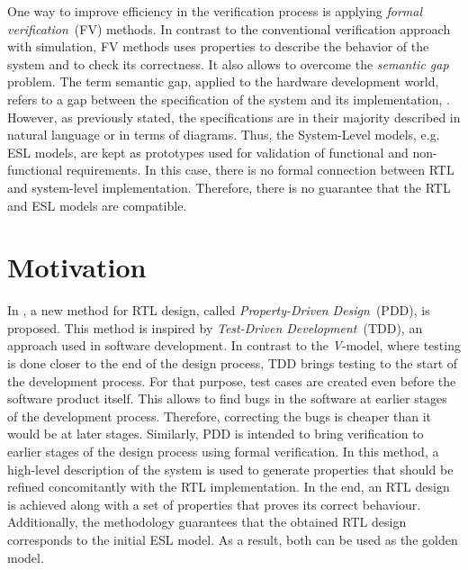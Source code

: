 One way to improve efficiency in the verification process is applying \textit{formal verification}~(FV) methods. In contrast to the conventional verification approach with simulation, FV methods uses properties to describe the behavior of the system and to check its correctness. It also allows to overcome the \textit{semantic gap} problem. The term semantic gap, applied to the hardware development world, refers to a gap between the specification of the system and its implementation,   . However, as previously stated, the specifications are in their majority described in natural language or in terms of diagrams. Thus, the System-Level models, e.g. ESL models, are kept as prototypes used for validation of functional and non-functional requirements. In this case, there is no formal connection between RTL and system-level implementation. Therefore, there is no guarantee that the RTL and ESL models are compatible.

\section*{Motivation}

In \cite{paper-pdd}, a new method for RTL design, called \textit{Property-Driven Design}~(PDD), is proposed. This method is inspired by \textit{Test-Driven Development}~(TDD), an approach used in software development. In contrast to the \textit{V}-model, where testing is done closer to the end of the design process, TDD brings testing to the start of the development process. For that purpose, test cases are created even before the software product itself. This allows to find bugs in the software at earlier stages of the development process. Therefore, correcting the bugs is cheaper than it would be at later stages. Similarly, PDD is intended to bring verification to earlier stages of the design process using formal verification. In this method, a high-level description of the system is used to generate properties that should be refined concomitantly with the RTL implementation. In the end, an RTL design is achieved along with a set of properties that proves its correct behaviour. Additionally, the methodology guarantees that the obtained RTL design corresponds to the initial ESL model. As a result, both can be used as the golden model.

